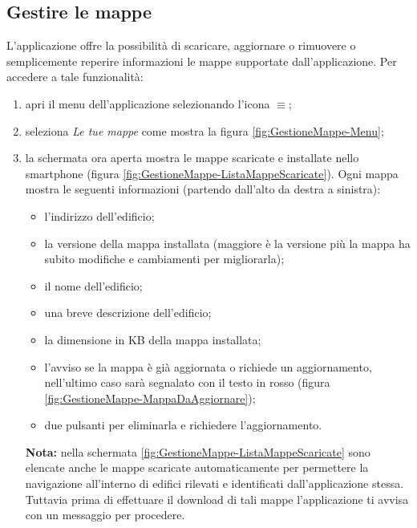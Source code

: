 \documentclass[../ClipsManualeUtente.tex]{subfiles}
\begin{document}

	\newpage
	\subsection{Gestire le mappe}
		L'applicazione offre la possibilità di scaricare, aggiornare o rimuovere o semplicemente reperire informazioni le mappe supportate dall'applicazione.
		Per accedere a tale funzionalità:
		\begin{enumerate}
			\item apri il menu dell'applicazione selezionando l'icona $\equiv$;
			\item seleziona \textit{Le tue mappe} come mostra la figura \ref{fig:GestioneMappe-Menu};
			\item la schermata ora aperta mostra le mappe scaricate e installate nello smartphone (figura \ref{fig:GestioneMappe-ListaMappeScaricate}). Ogni mappa mostra le seguenti informazioni (partendo dall'alto da destra a sinistra):
			\begin{itemize}
				\item l'indirizzo dell'edificio;
				\item la versione della mappa installata (maggiore è la versione più la mappa ha subito modifiche e cambiamenti per migliorarla);
				\item il nome dell'edificio;
				\item una breve descrizione dell'edificio;
				\item la dimensione in KB della mappa installata;
				\item l'avviso se la mappa è già aggiornata o richiede un aggiornamento, nell'ultimo caso sarà segnalato con il testo in rosso (figura \ref{fig:GestioneMappe-MappaDaAggiornare});
				\item due pulsanti per eliminarla e richiedere l'aggiornamento.
			\end{itemize}

		\begin{framed}
			\textbf{Nota:} nella schermata \ref{fig:GestioneMappe-ListaMappeScaricate} sono elencate anche le mappe scaricate automaticamente per permettere la navigazione all'interno di edifici rilevati e identificati dall'applicazione stessa. Tuttavia prima di effettuare il download di tali mappe l'applicazione ti avvisa con un messaggio per procedere.
		\end{framed}
		

\end{enumerate}
\end{document}
